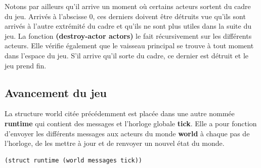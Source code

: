 Notons par ailleurs qu'il arrive un moment où certains acteurs sortent du cadre du jeu. Arrivés à l'abscisse 0, ces derniers doivent être détruits vue qu'ils sont arrivés à l'autre extrémité du cadre et qu'ils ne sont plus utiles dans la suite du jeu. La fonction \textbf{(destroy-actor actors)} le fait récursivement sur les différents acteurs. Elle vérifie également que le vaisseau principal se trouve à tout moment dans l'espace du jeu. S'il arrive qu'il sorte du cadre, ce dernier est détruit et le jeu prend fin.


\subsection{Avancement du jeu}
La structure world citée précédemment est placée dans une autre nommée \textbf{runtime} qui contient des messages et l'horloge globale \textbf{tick}. Elle a pour fonction d'envoyer les différents messages aux acteurs du monde \textbf{world} à chaque pas de l'horloge, de les mettre à jour et de renvoyer un nouvel état du monde.

\begin{lstlisting}[language={lisp},captionpos=b, frame=single]
(struct runtime (world messages tick))
\end{lstlisting}

